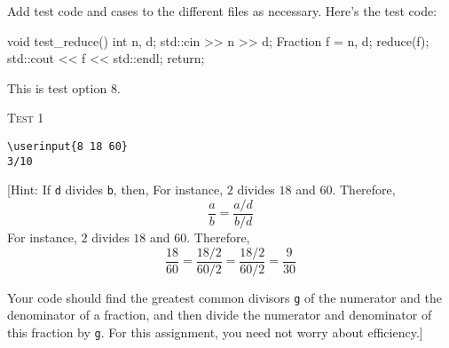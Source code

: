 Add test code and cases to the different files as necessary.
Here's the test code:
\begin{console}
void test_reduce()
{
    int n, d;
    std::cin >> n >> d;
    Fraction f = {n, d};
    reduce(f);
    std::cout << f << std::endl;
    return;
}
\end{console}
This is test option 8.

\textsc{Test 1}\vspace{-6pt}
\begin{Verbatim}[frame=single, commandchars=\\\{\}]
\userinput{8 18 60}
3/10
\end{Verbatim}

[Hint: If \verb!d! divides \verb!b!, then,
For instance, $2$ divides $18$ and $60$. Therefore,
\[
\frac{a}{b}
= \frac{a/d}{b/d}
\]
For instance, $2$ divides $18$ and $60$. Therefore,
\[
\frac{18}{60}
=
\frac{18/2}{60/2}
=
\frac{18/2}{60/2}
=
\frac{9}{30}
\]

Your code should find the greatest common divisors \verb!g! of the numerator
and the denominator of a fraction, and then divide the numerator and
denominator of this fraction by \verb!g!. For this assignment, you need not
worry about efficiency.]
